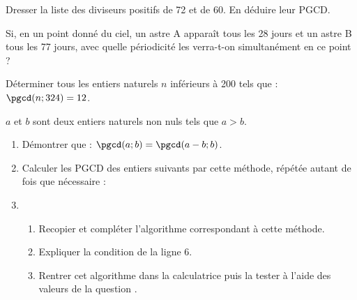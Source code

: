 \begin{colonne*exercice}
\begin{exercice}
Dresser la liste des diviseurs positifs de 72 et de 60. En déduire leur PGCD.
\end{exercice}

\begin{exercice}
Si, en un point donné du ciel, un astre A apparaît tous les 28 jours et un astre B tous les 77 jours, avec quelle périodicité les verra-t-on simultanément en ce point ?
\end{exercice}

\begin{exercice}
Déterminer tous les entiers naturels $n$ inférieurs à 200 tels que : $\pgcd(n;324)=12$.
\end{exercice}

\begin{exercice}[\algo]
  $a$ et $b$ sont deux entiers naturels non nuls tels que
  $a>b$.\vspace{-10pt}

\begin{enumerate}
\item Démontrer que : $\pgcd(a;b)=\pgcd(a-b ; b)$.
\item \label{Exo12Question2}Calculer les PGCD des entiers suivants par cette méthode, répétée autant de fois que nécessaire :
\item\begin{enumerate} 
\item Recopier et compléter l’algorithme correspondant à cette méthode.

{\centering
\begin{algorithme}
\BlocVariables
{}
\BlocEntrees
{}
\BlocTraitements
{}
\BlocAffichage
\AfficherVar{$\dots$}
\end{algorithme}
\par}
\item Expliquer la condition de la ligne 6.
\item Rentrer cet algorithme dans la calculatrice puis
la tester à l’aide des valeurs de la question
.
\end{enumerate}
\end{enumerate}
\end{exercice}


\end{colonne*exercice}
